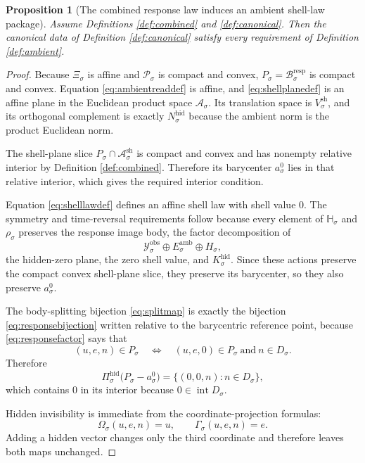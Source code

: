 \documentclass[11pt]{article}
\newcommand{\DataSpace}[1]{\mathcal Y_{#1}^{\mathrm{obs}}}
\newcommand{\AmbientSpace}[1]{\mathcal A_{#1}}
\newcommand{\AmbientBody}[1]{P_{#1}}
\newcommand{\AmbientRead}[1]{\Omega_{#1}}
\newcommand{\AmbientShellLaw}[1]{\Gamma_{#1}}
\newcommand{\ShellAffine}[1]{\mathcal A_{#1}^{\mathrm{sh}}}
\newcommand{\ShellVector}[1]{V_{#1}^{\mathrm{sh}}}
\newcommand{\HiddenSpace}[1]{N_{#1}^{\mathrm{hid}}}
\newcommand{\HiddenOperator}[1]{K_{#1}^{\mathrm{hid}}}
\newcommand{\HiddenProj}[1]{\Pi_{#1}^{\mathrm{hid}}}
\newcommand{\AmbientRef}[1]{a_{#1}^{0}}
\newcommand{\AmbientTarget}[1]{E_{#1}^{\mathrm{amb}}}
\newcommand{\ProtoBody}[1]{\mathcal P_{#1}}
\newcommand{\ResponseMap}[1]{\Xi_{#1}}
\newcommand{\ResponseImage}[1]{\mathcal B_{#1}^{\mathrm{resp}}}
\newcommand{\GapSpace}[1]{H_{#1}}
\newcommand{\GapBody}[1]{D_{#1}}
\newcommand{\ResponseSym}[1]{\mathbb H_{#1}}
\newcommand{\ResponseTime}[1]{\rho_{#1}}
\newtheorem{proposition}{Proposition}
\begin{document}
\begin{proposition}[The combined response law induces an ambient shell-law package]
\label{prop:ambient}
Assume Definitions \ref{def:combined} and \ref{def:canonical}. Then the canonical data of Definition \ref{def:canonical} satisfy every requirement of Definition \ref{def:ambient}.
\end{proposition}

\begin{proof}
Because \(\ResponseMap{\sigma}\) is affine and \(\ProtoBody{\sigma}\) is compact and convex, \(\AmbientBody{\sigma}=\ResponseImage{\sigma}\) is compact and convex. Equation \eqref{eq:ambientreaddef} is affine, and \eqref{eq:shellplanedef} is an affine plane in the Euclidean product space \(\AmbientSpace{\sigma}\). Its translation space is \(\ShellVector{\sigma}\), and its orthogonal complement is exactly \(\HiddenSpace{\sigma}\) because the ambient norm is the product Euclidean norm.

The shell-plane slice \(\AmbientBody{\sigma}\cap\ShellAffine{\sigma}\) is compact and convex and has nonempty relative interior by Definition \ref{def:combined}. Therefore its barycenter \(\AmbientRef{\sigma}\) lies in that relative interior, which gives the required interior condition.

Equation \eqref{eq:shelllawdef} defines an affine shell law with shell value \(0\). The symmetry and time-reversal requirements follow because every element of \(\ResponseSym{\sigma}\) and \(\ResponseTime{\sigma}\) preserves the response image body, the factor decomposition of
\[
\DataSpace{\sigma}\oplus \AmbientTarget{\sigma}\oplus \GapSpace{\sigma},
\]
the hidden-zero plane, the zero shell value, and \(\HiddenOperator{\sigma}\). Since these actions preserve the compact convex shell-plane slice, they preserve its barycenter, so they also preserve \(\AmbientRef{\sigma}\).

The body-splitting bijection \eqref{eq:splitmap} is exactly the bijection \eqref{eq:responsebijection} written relative to the barycentric reference point, because \eqref{eq:responsefactor} says that
\[
(u,e,n)\in \AmbientBody{\sigma}
\quad\Longleftrightarrow\quad
(u,e,0)\in \AmbientBody{\sigma}
\ \text{and}\ 
n\in \GapBody{\sigma}.
\]
Therefore
\[
\HiddenProj{\sigma}\bigl(\AmbientBody{\sigma}-\AmbientRef{\sigma}\bigr)
=
\{(0,0,n):n\in\GapBody{\sigma}\},
\]
which contains \(0\) in its interior because \(0\in\operatorname{int}\GapBody{\sigma}\).

Hidden invisibility is immediate from the coordinate-projection formulas:
\[
\AmbientRead{\sigma}(u,e,n) = u,
\qquad
\AmbientShellLaw{\sigma}(u,e,n)=e.
\]
Adding a hidden vector changes only the third coordinate and therefore leaves both maps unchanged.


\end{proof}
\end{document}
